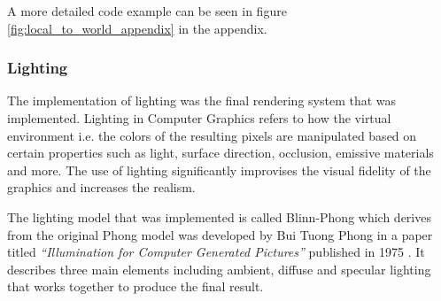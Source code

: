 \documentclass[11pt]{article}
\begin{document}
A more detailed code example can be seen in figure
\ref{fig:local_to_world_appendix} in the appendix.

\subsubsection{Lighting}
\newcommand{\intensity}{\operatorname{I}}
\newcommand{\lightdir}{\operatorname{L}}
\newcommand{\normal}{\operatorname{N}}
\newcommand{\diffuse}{\operatorname{D}}
\newcommand{\glslcolor}{\operatorname{C}}
\newcommand{\glslmax}{\operatorname{max}}

The implementation of lighting was the final rendering system that was
implemented. Lighting in Computer Graphics refers to how the virtual environment
i.e. the colors of the resulting pixels are manipulated based on certain
properties such as light, surface direction, occlusion, emissive materials and
more. The use of lighting significantly improvises the visual fidelity of the
graphics and increases the realism.

The lighting model that was implemented is called Blinn-Phong which derives from
the original Phong model was developed by Bui Tuong Phong in a paper titled
\textit{``Illumination for Computer Generated Pictures''} published in 1975
\cite{blinn}. It describes three main elements including ambient, diffuse and
specular lighting that works together to produce the final result.
\end{document}
